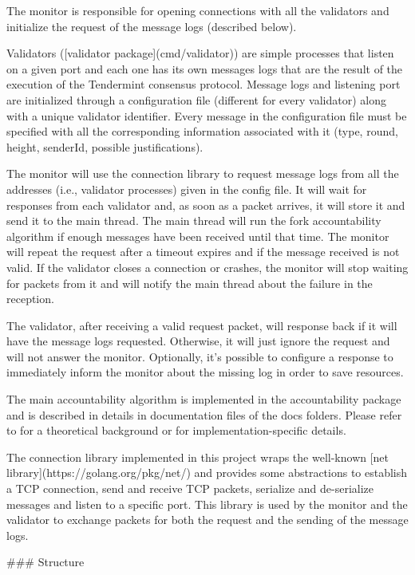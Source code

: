\documentclass[a4paper,11pt,oneside]{report}
\begin{document}
\begin{markdown}
The monitor is responsible for opening connections with all the validators and initialize the request of the message logs (described below).

Validators ([validator package](cmd/validator)) are simple processes that listen on a given port and each one has its own messages logs that are the result of the execution of the Tendermint consensus protocol. Message logs and listening port are initialized through a configuration file (different for every validator) along with a unique validator identifier.
Every message in the configuration file must be specified with all the corresponding information associated with it (type, round, height, senderId, possible justifications).

The monitor will use the connection library to request message logs from all the addresses (i.e., validator processes) given in the config file. It will wait for responses from each validator and, as soon as a packet arrives, it will store it and send it to the main thread. The main thread will run the fork accountability algorithm if enough messages have been received until that time.
The monitor will repeat the request after a timeout expires and if the message received is not valid. If the validator closes a connection or crashes, the monitor will stop waiting for packets from it and will notify the main thread about the failure in the reception.

The validator, after receiving a valid request packet, will response back if it will have the message logs requested. Otherwise, it will just ignore the request and will not answer the monitor. Optionally, it's possible to configure a response to immediately inform the monitor about the missing log in order to save resources.

The main accountability algorithm is implemented in the accountability package and is described in details in documentation files of the docs folders. Please refer to for a theoretical background or for implementation-specific details.

The connection library implemented in this project wraps the well-known [net library](https://golang.org/pkg/net/) and provides some abstractions to establish a TCP connection, send and receive TCP packets, serialize and de-serialize messages and listen to a specific port.
This library is used by the monitor and the validator to exchange packets for both the request and the sending of the message logs.

### Structure


\end{markdown}
\end{document}
